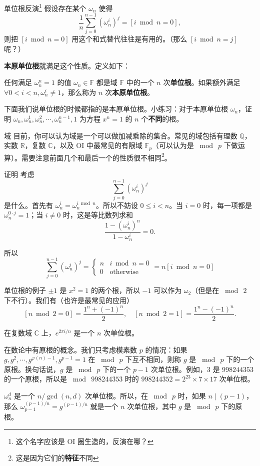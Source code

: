 \begin{frame}{单位根反演\footnote{这个名字应该是 OI 圈生造的，反演在哪？}}
    假设存在某个 $\omega_n$ 使得
    $$
    \frac{1}{n}\sum_{j=0}^{n-1}(\omega_n^i)^j=[i\bmod n=0],
    $$
    则把 $[i\bmod n=0]$ 用这个和式替代往往是有用的。（那么 $[i\bmod n=j]$ 呢？）

    \textbf{本原单位根}就满足这个性质。定义如下：
    \begin{definition}
        任何满足 $\omega_n^n=1$ 的值 $\omega_n\in\mathbb F$ 都是域 $\mathbb F$ 中的一个 $n$ 次\textbf{单位根}。如果额外满足 $\forall 0<i<n,\omega_n^i\ne 1$，那么称为 $n$ 次\textbf{本原单位根}。  
    \end{definition}
    下面我们说单位根的时候都指的是本原单位根。小练习：对于本原单位根 $\omega_n$，证明 $\omega_n,\omega_n^1,\omega_n^2,\cdots,\omega_n^{n-1},1$ 为方程 $x^n=1$ 的 $n$ 个\textbf{不同}的根。
\end{frame}
\begin{frame}{域}
    目前，你可以认为域是一个可以做加减乘除的集合。常见的域包括有理数 $\mathbb Q$，实数 $\mathbb R$，复数 $\mathbb C$，以及 OI 中最常见的有限域 $\mathbb F_p$（可以认为是 $\bmod\ p$ 下做运算）。需要注意前面几个和最后一个的性质很不相同\footnote{这是因为它们的\textbf{特征}不同}。
\end{frame}
\begin{frame}{证明}
    考虑
    $$
    \sum_{j=0}^{n-1}(\omega_n^i)^j
    $$
    是什么。首先有 $\omega_n^{i}=\omega_n^{i\bmod n}$。所以不妨设 $0\le i<n$。当 $i=0$ 时，每一项都是 $\omega_n^{0\cdot j}=1$；当 $i\ne 0$ 时，这是等比数列求和
    $$
    \frac{1-(\omega_n^i)^n}{1-\omega_n^i}=0.
    $$

    所以
    $$
    \sum_{j=0}^{n-1}(\omega_n^i)^j=\begin{cases}
        n&i\bmod n=0\\
        0&\text{otherwise}
    \end{cases}
    =n[i\bmod n=0]
    $$
\end{frame}
\begin{frame}{单位根的例子}
    $\pm 1$ 是 $x^2=1$ 的两个根，所以 $-1$ 可以作为 $\omega_2$（但是在 $\bmod\ 2$ 下不行）。我们有（也许是最常见的应用）
    $$
    [n\bmod 2=0]=\frac{1^n+(-1)^n}{2},\quad [n\bmod 2=1]=\frac{1^n-(-1)^n}{2}.
    $$

    在复数域 $\mathbb C$ 上，$e^{2\pi i/n}$ 是一个 $n$ 次单位根。

    在数论中有原根的概念。我们只考虑模素数 $p$ 的情况：如果 $g,g^2,\cdots,g^{\varphi(n)-1},g^{p-1}=1$ 在 $\bmod\ p$ 下互不相同，则称 $g$ 是 $\bmod\ p$ 下的一个原根。换句话说，$g$ 是 $\bmod\ p$ 下的一个 $p-1$ 次单位根。例如，$3$ 是 $998244353$ 的一个原根，所以是 $\bmod\ 998244353$ 时的 $998244352=2^{23}\times 7\times 17$ 次单位根。

    $\omega_n^{d}$ 是一个 $n/\gcd(n,d)$ 次单位根。所以，在 $\bmod\ p$ 时，如果 $n\mid (p-1)$，那么 $\omega_{p-1}^{(p-1)/n}=g^{(p-1)/n}$ 就是一个 $n$ 次单位根，其中 $g$ 是 $\bmod\ p$ 下的原根。
\end{frame}
